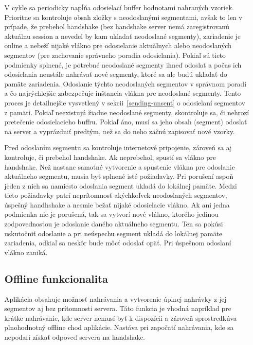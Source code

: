 V cykle sa periodicky napĺňa odosielací buffer hodnotami nahraných vzoriek. Prioritne sa kontroluje obsah zložky s neodoslanými segmentami, avšak to len v prípade, že prebehol handshake (bez handshake server nemá zaregistrovanú aktuálnu session a nevedel by kam ukladať neodoslané segmenty), zariadenie je online a nebeží nijaké vlákno pre odosielanie aktuálnych alebo neodoslaných segmentov (pre zachovanie správneho poradia odosielania). Pokiaľ sú tieto podmienky splnené, je potrebné neodoslané segmenty ihneď odoslať a počas ich odosielania neustále nahrávať nové segmenty, ktoré sa ale budú ukladať do pamäte zariadenia. Odoslanie týchto neodoslaných segmentov v správnom poradí a čo najrýchlejšie zabezpečuje inštancia vlákna pre neodoslané segmenty. Tento proces je detailnejšie vysvetlený v sekcii~\ref{sending-unsent} o odosielaní segmentov z pamäti. Pokiaľ neexistujú žiadne neodoslané segmenty, skontroluje sa, či nehrozí pretečenie odosielacieho buffru. Pokiaľ áno, musí sa jeho obsah (segment) odoslať na server a vyprázdniť predtým, než sa do neho začnú zapisovať nové vzorky. 

Pred odoslaním segmentu sa kontroluje internetové pripojenie, zároveň sa aj kontroluje, či prebehol handshake. Ak neprebehol, spustí sa vlákno pre handshake. Než nastane samotné vytvorenie a spustenie vlákna pre odoslanie aktuálneho segmentu, musia byť splnené isté požiadavky. Pri porušení aspoň jeden z nich sa namiesto odoslania segment ukladá do lokálnej pamäte. Medzi tieto požiadavky patrí neprítomnosť akýchkoľvek neodoslaných segmentov, úspešný handhshake a nesmie bežať nijaké odosielacie vlákno. Ak ani jedna podmienka nie je porušená, tak sa vytvorí nové vlákno, ktorého jedinou zodpovednosťou je odoslanie daného aktuálneho segmentu. Ten sa pokúsi uskutočniť odoslanie a pri neúspechu segment ukladá do lokálnej pamäte zariadenia, odkiaľ sa neskôr bude môcť odoslať opäť. Pri úspešnom odoslaní vlákno zaniká.


\subsection{Offline funkcionalita}
\label{serverless-recording}

Aplikácia obsahuje možnosť nahrávania a vytvorenie úplnej nahrávky z jej segmentov aj bez prítomnosti servera. Táto funkcia je vhodná napríklad pre krátke nahrávanie, kde server nemusí byť k dispozícii a zároveň sprostredkúva plnohodnotný offline chod aplikácie. Nastáva pri započatí nahrávania, kde sa nepodarí získať odpoveď servera na handshake.

